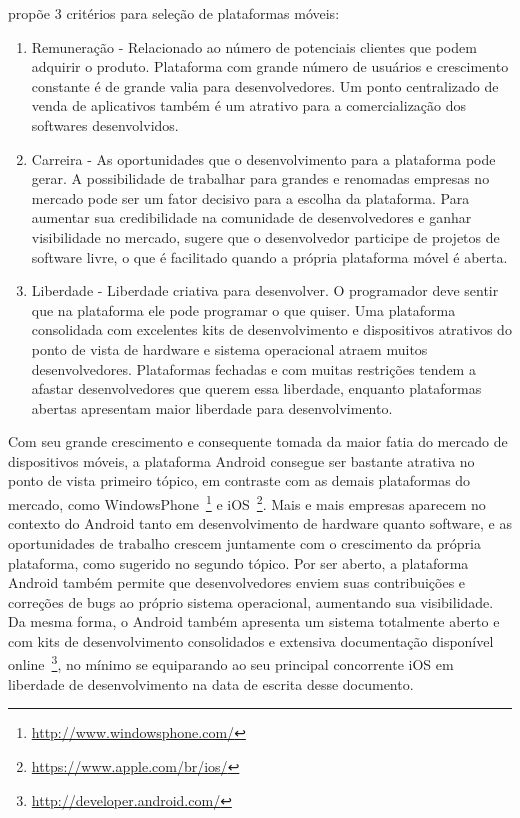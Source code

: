  propõe 3 critérios para seleção de plataformas móveis:
\begin{enumerate}
\item Remuneração - Relacionado ao número de potenciais clientes que podem adquirir o produto. Plataforma com grande número de usuários e crescimento constante é de grande valia para desenvolvedores. Um ponto centralizado de venda de aplicativos também é um atrativo para a comercialização dos softwares desenvolvidos.
\item Carreira - As oportunidades que o desenvolvimento para a plataforma pode gerar. A possibilidade de trabalhar para grandes e renomadas empresas no mercado pode ser um fator decisivo para a escolha da plataforma. Para aumentar sua credibilidade na comunidade de desenvolvedores e ganhar visibilidade no mercado,  sugere que o desenvolvedor participe de projetos de software livre, o que é facilitado quando a própria plataforma móvel é aberta.
\item Liberdade - Liberdade criativa para desenvolver. O programador deve sentir que na plataforma ele pode programar o que quiser. Uma plataforma consolidada com excelentes kits de desenvolvimento e dispositivos atrativos do ponto de vista de hardware e sistema operacional atraem muitos desenvolvedores. Plataformas fechadas e com muitas restrições tendem a afastar desenvolvedores que querem essa liberdade, enquanto plataformas abertas apresentam maior liberdade para desenvolvimento.
\end{enumerate}

Com seu grande crescimento e consequente tomada da maior fatia do mercado de dispositivos móveis, a plataforma Android consegue ser bastante atrativa no ponto de vista primeiro tópico, em contraste com as demais plataformas do mercado, como WindowsPhone~\footnote{\url{http://www.windowsphone.com/}} e iOS~\footnote{\url{https://www.apple.com/br/ios/}}. Mais e mais empresas aparecem no contexto do Android tanto em desenvolvimento de hardware quanto software, e as oportunidades de trabalho crescem juntamente com o crescimento da própria plataforma, como sugerido no segundo tópico. Por ser aberto, a plataforma Android também permite que desenvolvedores enviem suas contribuições e correções de bugs ao próprio sistema operacional, aumentando sua visibilidade. Da mesma forma, o Android também apresenta um sistema totalmente aberto e com kits de desenvolvimento consolidados e extensiva documentação disponível online~\footnote{\url{http://developer.android.com/}}, no mínimo se equiparando ao seu principal concorrente iOS em liberdade de desenvolvimento na data de escrita desse documento.

